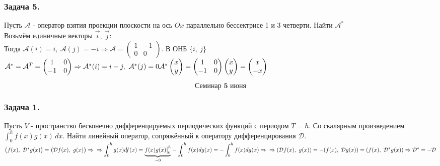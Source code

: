\documentclass[12pt, letterpaper, twoside]{article}
\newcommand{\DS}{\displaystyle}
\begin{document}
\subsubsection*{Задача 5.}
Пусть $\mathcal{A}$ - оператор взятия проекции плоскости на ось $Ox$ параллельно бессектрисе 1 и 3 четверти. Найти $\mathcal{A}^*$\\
Возьмём единичные векторы $\vec{i},\ \vec{j}$:\\
Тогда $\mathcal{A}(i) = i,\ \mathcal{A}(j) = -i\Rightarrow \mathcal{A} = \begin{pmatrix}
    1 & -1\\
    0 & 0
\end{pmatrix}$. В ОНБ $\{i,\ j\}$\\
$\mathcal{A}^* = \mathcal{A}^T = \begin{pmatrix}
    1 & 0\\
    -1 & 0
\end{pmatrix}\Rightarrow \mathcal{A}^*(i) = i - j,\ \mathcal{A}^*(j) = 0\\
\mathcal{A}^*\begin{pmatrix}
    x\\
    y
\end{pmatrix} = \begin{pmatrix}
    1 & 0\\
    -1 & 0
\end{pmatrix}\begin{pmatrix}
    x\\
    y
\end{pmatrix} = \begin{pmatrix}
    x\\
    -x
\end{pmatrix}$

\[\textbf{Семинар 5 июня}\]
\subsubsection*{Задача 1.}
    Пусть $V$ - пространство бесконечно дифференцируемых периодических функций с периодом $T = h$. Со скалярным произведением $\DS \int_0^h f(x) g(x)\, dx$. Найти линейный оператор, сопряжённый к оператору дифференцирования $\mathcal{D}$.\\
    $\big(f(x),\ \mathcal{D}^* g(x)\big) = \big( \mathcal{D} f(x),\ g(x) \big)\Rightarrow\\
    \Rightarrow \DS\int_0^h g(x) df(x) = \underset{=0}{\underbrace{f(x)g(x)\big|_0^h}} - \int_0^h f(x) dg(x) = -\int_0^h f(x)dg(x) \Rightarrow\\
    \Rightarrow    (\mathcal{D} f(x),\ g(x)) = -(f(x),\ \mathcal{D}g(x)) = (f(x),\ \mathcal{D}^*g(x))\Rightarrow \mathcal{D}^* = -\mathcal{D}$
\end{document}
